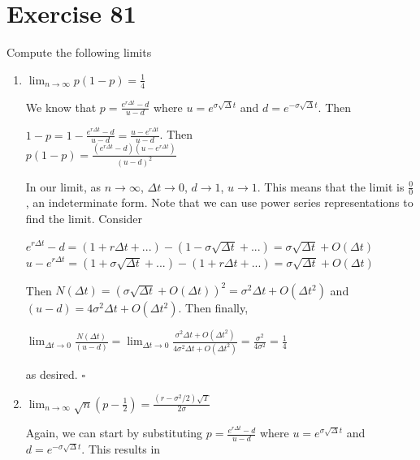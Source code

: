\documentclass{article}
\begin{document}
\section*{Exercise 81}
Compute the following limits
\begin{enumerate}
    \item $\lim_{n \rightarrow \infty} p(1-p) = \frac{1}{4}$
        \begin{flushleft}
            We know that $p = \frac{e^{r\Delta t} - d}{u-d}$ where $u = e^{\sigma \sqrt{\Delta}t}$ and $d = e^{- \sigma \sqrt{\Delta}t}$. Then
            \begin{center}
                $1-p = 1 - \frac{e^{r\Delta t} - d}{u-d} = \frac{u - e^{r \Delta t}}{u-d}$. Then \\
                $p(1-p) = \frac{(e^{r\Delta t} - d)(u - e^{r \Delta t})}{(u-d)^2}$
            \end{center}
            In our limit, as $n \rightarrow \infty$, $\Delta t \rightarrow 0$, $d \rightarrow 1$, $u \rightarrow 1$. This means that the limit is $\frac{0}{0}$, an indeterminate form.
            Note that we can use power series representations to find the limit. Consider
            \begin{center}
                $e^{r\Delta t} - d = (1 + r\Delta t + ...) - (1 - \sigma \sqrt{\Delta t} + ...) = \sigma \sqrt{\Delta t} + O(\Delta t)$ \\
                $u - e^{r\Delta t} = (1 + \sigma \sqrt{\Delta t} + ...) - (1 + r\Delta t + ...) = \sigma \sqrt{\Delta t} + O(\Delta t)$
            \end{center}
            Then $N(\Delta t) = (\sigma \sqrt{\Delta t} + O(\Delta t))^2 = \sigma^2 \Delta t + O(\Delta t^2)$ and $(u-d) = 4\sigma^2\Delta t + O(\Delta t^2)$. Then finally,
            \begin{center}
                $\lim_{\Delta t \rightarrow 0} \frac{N(\Delta t)}{(u-d)} = \lim_{\Delta t \rightarrow 0} \frac{\sigma^2 \Delta t + O(\Delta t^2)}{4\sigma^2\Delta t + O(\Delta t^2)} = \frac{\sigma^2}{4\sigma^2} = \frac{1}{4}$
            \end{center}
            as desired. $\square$
        \end{flushleft}
    \item $\lim_{n \rightarrow \infty} \sqrt{n}(p - \frac{1}{2}) = \frac{(r-\sigma^2/2)\sqrt{T}}{2\sigma}$
        \begin{flushleft}
            Again, we can start by substituting $p = \frac{e^{r\Delta t} - d}{u-d}$ where $u = e^{\sigma \sqrt{\Delta}t}$ and $d = e^{- \sigma \sqrt{\Delta}t}$. This results in

\end{flushleft}
\end{enumerate}
\end{document}
